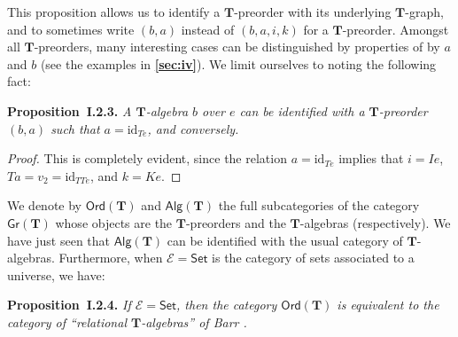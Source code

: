 \documentclass{article}
\newenvironment{itenv}[1]
  {\phantomsection\par\medskip\noindent\textbf{#1.}\itshape}
  {\par\medskip}
\newcommand{\oldpage}[1]{\marginpar{\footnotesize$\Big\vert$ \textit{p.~#1}}}
\newcommand{\unsure}[1]{{\color{purple}\textbf{#1}}}
\newcommand{\id}{\mathrm{id}}
\newcommand{\TT}{\mathbf{T}}
\newcommand{\cat}[1]{\mathcal{#1}}
\newcommand{\Cat}[1]{\mathsf{#1}}
\newcommand{\Gr}[1]{\Cat{Gr}(#1)}
\newcommand{\Alg}[1]{\Cat{Alg}(#1)}
\newcommand{\Ord}[1]{\Cat{Ord}(#1)}
\begin{document}
This proposition allows us to identify a $\TT$-preorder with its underlying $\TT$-graph, and to sometimes write $(b,a)$ instead of $(b,a,i,k)$ for a $\TT$-preorder.
Amongst all $\TT$-preorders, many interesting cases can be distinguished by properties of by $a$ and $b$ (see the examples in \unsure{\cref{sec:iv}}).
We limit ourselves to noting the following fact:

\begin{itenv}{Proposition~I.2.3}
  A $\TT$-algebra $b$ over $e$ can be identified with a $\TT$-preorder $(b,a)$ such that $a=\id_{Te}$, and conversely.
\end{itenv}

\begin{proof}
  This is completely evident, since the relation $a=\id_{Te}$ implies that $i=Ie$, $Ta=v_2=\id_{TTe}$, and $k=Ke$.
\end{proof}

\oldpage{231}
We denote by $\Ord{\TT}$ and $\Alg{\TT}$ the full subcategories of the category $\Gr{\TT}$ whose objects are the $\TT$-preorders and the $\TT$-algebras (respectively).
We have just seen that $\Alg{\TT}$ can be identified with the usual category of $\TT$-algebras.
Furthermore, when $\cat{E}=\Cat{Set}$ is the category of sets associated to a universe, we have:

\begin{itenv}{Proposition~I.2.4}
\label{proposition:i.2.4}
  If $\cat{E}=\Cat{Set}$, then the category $\Ord{\TT}$ is equivalent to the category of ``relational $\TT$-algebras'' of Barr {\cite{Ba}}.
\end{itenv}
\end{document}
